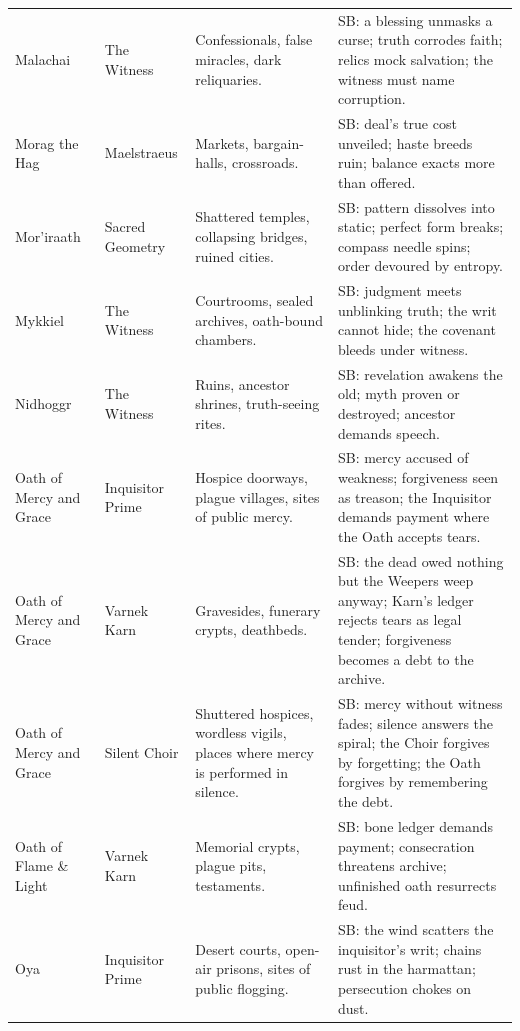 \begin{longtable}{@{}p{3.3cm}p{3.3cm}p{4.6cm}p{7.2cm}@{}}
  Malachai & The Witness &
  Confessionals, false miracles, dark reliquaries. &
  SB: a blessing unmasks a curse; truth corrodes faith; relics mock salvation; the witness must name corruption. \\

  Morag the Hag & Maelstraeus &
  Markets, bargain-halls, crossroads. &
  SB: deal's true cost unveiled; haste breeds ruin; balance exacts more than offered. \\

  Mor'iraath & Sacred Geometry &
  Shattered temples, collapsing bridges, ruined cities. &
  SB: pattern dissolves into static; perfect form breaks; compass needle spins; order devoured by entropy. \\

  Mykkiel & The Witness &
  Courtrooms, sealed archives, oath-bound chambers. &
  SB: judgment meets unblinking truth; the writ cannot hide; the covenant bleeds under witness. \\

  Nidhoggr & The Witness &
  Ruins, ancestor shrines, truth-seeing rites. &
  SB: revelation awakens the old; myth proven or destroyed; ancestor demands speech. \\

  Oath of Mercy and Grace & Inquisitor Prime &
  Hospice doorways, plague villages, sites of public mercy. &
  SB: mercy accused of weakness; forgiveness seen as treason; the Inquisitor demands payment where the Oath accepts tears. \\

  Oath of Mercy and Grace & Varnek Karn &
  Gravesides, funerary crypts, deathbeds. &
  SB: the dead owed nothing but the Weepers weep anyway; Karn's ledger rejects tears as legal tender; forgiveness becomes a debt to the archive. \\

  Oath of Mercy and Grace & Silent Choir &
  Shuttered hospices, wordless vigils, places where mercy is performed in silence. &
  SB: mercy without witness fades; silence answers the spiral; the Choir forgives by forgetting; the Oath forgives by remembering the debt. \\

  Oath of Flame \& Light & Varnek Karn &
  Memorial crypts, plague pits, testaments. &
  SB: bone ledger demands payment; consecration threatens archive; unfinished oath resurrects feud. \\
  
  Oya & Inquisitor Prime &
  Desert courts, open-air prisons, sites of public flogging. &
  SB: the wind scatters the inquisitor's writ; chains rust in the harmattan; persecution chokes on dust. \\
  

\end{longtable}
